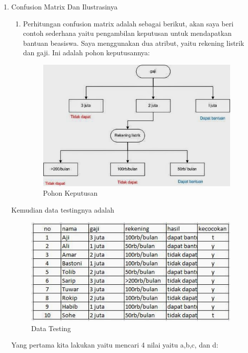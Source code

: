 \begin{enumerate}
\begin {enumerate}
\item Confusion Matrix Dan Ilustrasinya
\begin{enumerate}
\item Perhitungan confusion matrix adalah sebagai berikut, akan saya beri contoh sederhana yaitu pengambilan keputusan untuk mendapatkan bantuan beasiswa. Saya menggunakan dua atribut, yaitu rekening listrik dan gaji. Ini adalah pohon keputusannya:
 
\begin{figure}[ht]
\centering
\includegraphics[scale=0.5]{figures/AFS/7.jpg}
\caption{Pohon Keputusan}
\label{contoh}
\end{figure}
\end{enumerate}


Kemudian data testingnya adalah

\begin{figure}[ht]
\centering
\includegraphics[scale=0.5]{figures/AFS/8.jpg}
\caption{Data Testing}
\label{contoh}
\end{figure}

Yang pertama kita lakukan yaitu mencari 4 nilai yaitu a,b,c, dan d:


\end{enumerate}
\end{enumerate}

